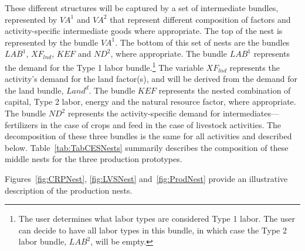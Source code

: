 \documentclass[11pt,letterpaper]{report}
\begin{document}
These different structures will be captured by a set of intermediate bundles,
represented by $\mathit{VA}^1$ and $\mathit{VA}^2$ that represent different
composition of factors and activity-specific intermediate goods where
appropriate. The top of the nest is represented by the bundle $\mathit{VA^1}$.
The bottom of this set of nests are the bundles $\mathit{LAB^1}$,
$\mathit{XF}_{\mathit{lnd}}$, $\mathit{KEF}$ and $\mathit{ND^2}$, where
appropriate. The bundle $\mathit{LAB^1}$ represents the demand for the Type 1
labor bundle.\footnote{The user determines what labor types are considered
Type 1 labor. The user can decide to have all labor types in this bundle,
in which case the Type 2 labor bundle, $\mathit{LAB^2}$, will be empty.} The
variable $\mathit{XF}_{\mathit{lnd}}$ represents the activity's demand for the
land factor(s), and will be derived from the demand
for the land bundle, $\mathit{Land}^d$. The bundle $\mathit{KEF}$ represents the nested combination of
capital, Type 2 labor, energy and the natural resource factor, where
appropriate. The bundle $\mathit{ND^2}$ represents the activity-specific demand
for intermediates---fertilizers in the case of crops and feed in the case of
livestock activities. The decomposition of these three
bundles is the same for
all activities and described below. Table~\ref{tab:TabCESNests} summarily
describes the composition of these middle nests for the three production
prototypes.

Figures~\ref{fig:CRPNest}, \ref{fig:LVSNest} and~\ref{fig:ProdNest} provide an
illustrative description of the production nests.
\end{document}
